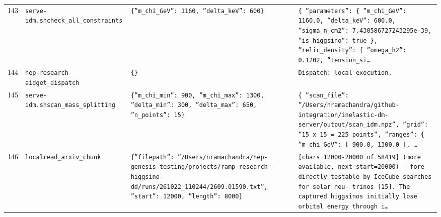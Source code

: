 \documentclass[11pt,a4paper]{article}
\begin{document}
\begin{longtable}{@{}p{}p{}p{}p{}@{}}
143 & \texttt{serve-idm.sh}\newline\texttt{check\_\allowbreak{}all\_\allowbreak{}constraints} & \texttt{\{''m\_\allowbreak{}chi\_\allowbreak{}GeV'':\allowbreak{} 1160,\allowbreak{} ''delta\_\allowbreak{}keV'':\allowbreak{} 600\}\allowbreak{}} & \texttt{\{   ''parameters'':\allowbreak{} \{     ''m\_\allowbreak{}chi\_\allowbreak{}GeV'':\allowbreak{} 1160.0,\allowbreak{}     ''delta\_\allowbreak{}keV'':\allowbreak{} 600.0,\allowbreak{}     ''sigma\_\allowbreak{}n\_\allowbreak{}cm2'':\allowbreak{} 7.430586727243295e-39,\allowbreak{}     ''is\_\allowbreak{}higgsino'':\allowbreak{} true   \}\allowbreak{},\allowbreak{}   ''relic\_\allowbreak{}density'':\allowbreak{} \{     ''omega\_\allowbreak{}h2'':\allowbreak{} 0.1202,\allowbreak{}     ''tension\_\allowbreak{}si\ldots{}\allowbreak{}} \\
144 & \texttt{hep-research-aid}\newline\texttt{get\_\allowbreak{}dispatch} & \texttt{\{\}\allowbreak{}} & \texttt{Dispatch:\allowbreak{} local execution.} \\
145 & \texttt{serve-idm.sh}\newline\texttt{scan\_\allowbreak{}mass\_\allowbreak{}splitting} & \texttt{\{''m\_\allowbreak{}chi\_\allowbreak{}min'':\allowbreak{} 900,\allowbreak{} ''m\_\allowbreak{}chi\_\allowbreak{}max'':\allowbreak{} 1300,\allowbreak{} ''delta\_\allowbreak{}min'':\allowbreak{} 300,\allowbreak{} ''delta\_\allowbreak{}max'':\allowbreak{} 650,\allowbreak{} ''n\_\allowbreak{}points'':\allowbreak{} 15\}\allowbreak{}} & \texttt{\{   ''scan\_\allowbreak{}file'':\allowbreak{} ''/\allowbreak{}Users/\allowbreak{}nramachandra/\allowbreak{}github-integration/\allowbreak{}inelastic-dm-server/\allowbreak{}output/\allowbreak{}scan\_\allowbreak{}idm.npz'',\allowbreak{}   ''grid'':\allowbreak{} ''15 x 15 =\allowbreak{} 225 points'',\allowbreak{}   ''ranges'':\allowbreak{} \{     ''m\_\allowbreak{}chi\_\allowbreak{}GeV'':\allowbreak{} [       900.0,\allowbreak{}       1300.0     ]\allowbreak{},\allowbreak{}  \ldots{}\allowbreak{}} \\
146 & \texttt{local}\newline\texttt{read\_\allowbreak{}arxiv\_\allowbreak{}chunk} & \texttt{\{''filepath'':\allowbreak{} ''/\allowbreak{}Users/\allowbreak{}nramachandra/\allowbreak{}hep-genesis-testing/\allowbreak{}projects/\allowbreak{}ramp-research-higgsino-dd/\allowbreak{}runs/\allowbreak{}261022\_\allowbreak{}110244/\allowbreak{}2609.01590.txt'',\allowbreak{} ''start'':\allowbreak{} 12000,\allowbreak{} ''length'':\allowbreak{} 8000\}\allowbreak{}} & \texttt{[chars 12000-20000 of 58419]\allowbreak{} (more available,\allowbreak{} next start=\allowbreak{}20000)\allowbreak{}  - fore directly testable by IceCube searches for solar neu- trinos [15]\allowbreak{}. The captured higgsinos initially lose orbital energy through i\ldots{}\allowbreak{}} \\

\end{longtable}
\end{document}
